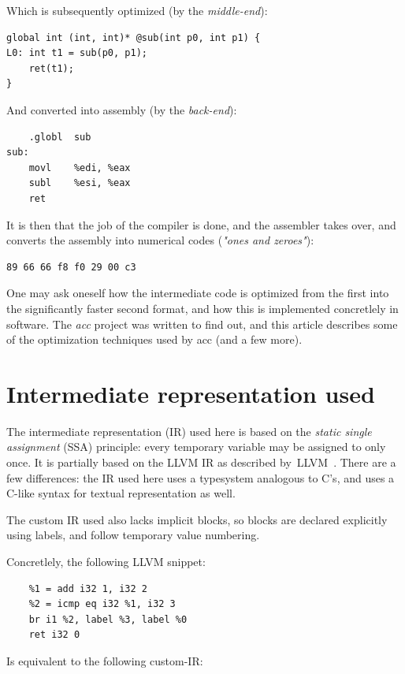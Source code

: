 \documentclass[12pt, a4paper]{article}
\begin{document}
Which is subsequently optimized (by the \textit{middle-end}):

\begin{lstlisting}
global int (int, int)* @sub(int p0, int p1) {
L0:	int t1 = sub(p0, p1);
	ret(t1);
}
\end{lstlisting}

And converted into assembly (by the \textit{back-end}):

\begin{lstlisting}
	.globl	sub
sub:
	movl	%edi, %eax
	subl	%esi, %eax
	ret
\end{lstlisting}

It is then that the job of the compiler is done, and the assembler takes over,
and converts the assembly into numerical codes (\textit{"ones and zeroes"}):

\begin{lstlisting}
89 66 66 f8 f0 29 00 c3
\end{lstlisting}

One may ask oneself how the intermediate code is optimized from the first into
the significantly faster second format, and how this is implemented concretlely
in software. The \textit{acc} project was written to find out, and this article
describes some of the optimization techniques used by acc (and a few more).

  \section{Intermediate representation used}
  \label{sec:irused}
The intermediate representation (IR) used here is based on the \textit{static
single assignment} (SSA) principle: every temporary variable may be assigned to
only once. It is partially based on the LLVM IR as described by~LLVM~\cite{llvm_ir}.
There are a few differences: the IR used here  uses a typesystem analogous to
C's, and uses a C-like syntax for textual 
representation as well.

The custom IR used also lacks implicit blocks, so blocks are declared 
explicitly using labels, and follow temporary value numbering.

Concretlely, the following LLVM snippet:

\begin{lstlisting}
	%1 = add i32 1, i32 2
	%2 = icmp eq i32 %1, i32 3
	br i1 %2, label %3, label %0
	ret i32 0
\end{lstlisting}

Is equivalent to the following custom-IR:
\end{document}

